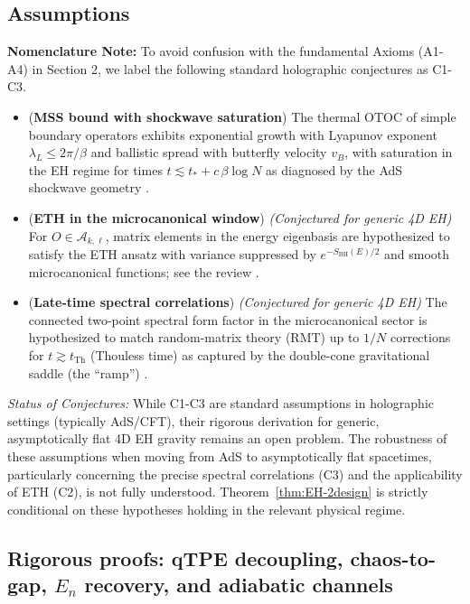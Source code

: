 \documentclass[aps,prd,preprint,onecolumn,superscriptaddress,nofootinbib,longbibliography,floatfix,11pt,showpacs,showkeys]{revtex4-2}
\theoremstyle{plain}
\theoremstyle{definition}
\theoremstyle{remark}
\begin{document}
\subsection{Assumptions}
\textbf{Nomenclature Note:} To avoid confusion with the fundamental Axioms (A1-A4) in Section 2, we label the following standard holographic conjectures as C1-C3.
\begin{itemize}[leftmargin=*]
  \item[C1.] ({\bf MSS bound with shockwave saturation}) The thermal OTOC of simple boundary operators exhibits exponential growth with Lyapunov exponent $\lambda_L\le 2\pi/\beta$ and ballistic spread with butterfly velocity $v_B$, with saturation in the EH regime for times $t\lesssim t_\ast+c\,\beta\log N$ as diagnosed by the AdS shockwave geometry \cite{Maldacena:2016,ShenkerStanford:2014}.
  \item[C2.] ({\bf ETH in the microcanonical window}) \textit{(Conjectured for generic 4D EH)} For $O\in \mathscr{A}_{k,\ell}$, matrix elements in the energy eigenbasis are hypothesized to satisfy the ETH ansatz with variance suppressed by $e^{-S_{\mathrm{BH}}(E)/2}$ and smooth microcanonical functions; see the review \cite{DAlessioKafriPolkovnikovRigol2016}.
  \item[C3.] ({\bf Late-time spectral correlations}) \textit{(Conjectured for generic 4D EH)} The connected two-point spectral form factor in the microcanonical sector is hypothesized to match random-matrix theory (RMT) up to $1/N$ corrections for $t\gtrsim t_{\mathrm{Th}}$ (Thouless time) as captured by the double-cone gravitational saddle (the ``ramp'') \cite{SaadShenkerStanford2019,Cotler:2017}.
\end{itemize}

\noindent\textit{Status of Conjectures:} While C1-C3 are standard assumptions in holographic settings (typically AdS/CFT), their rigorous derivation for generic, asymptotically flat 4D EH gravity remains an open problem. The robustness of these assumptions when moving from AdS to asymptotically flat spacetimes, particularly concerning the precise spectral correlations (C3) and the applicability of ETH (C2), is not fully understood. Theorem~\ref{thm:EH-2design} is strictly conditional on these hypotheses holding in the relevant physical regime.


\subsection{Rigorous proofs: qTPE decoupling, chaos-to-gap, \texorpdfstring{$E_n$}{En} recovery, and adiabatic channels}\label{sec:rigorous-results}
\providecommand{\Mtwo}{\mathcal{M}^{(2)}}
\providecommand{\FP}{\mathcal{F}}
\end{document}
